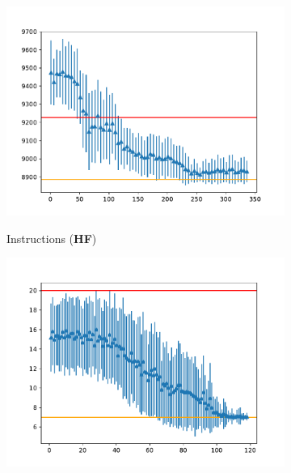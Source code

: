 \begin{figure}
     \centering
     \begin{subfigure}[b]{0.4\textwidth}
         \centering
         \includegraphics[width=\textwidth]{doccam_figures/tree_hf_lr_0001/Number_of_instructions_75_339_sparsed.pdf}
         \label{fig:inst}
         \vspace{-0.2in}
         \caption{Instructions (\textbf{HF})}
       \end{subfigure}
     \begin{subfigure}[b]{0.4\textwidth}
         \centering
         \includegraphics[width=\textwidth]{doccam_figures/tree_hf_lr_0001/COP_gadgets_75_119.pdf}
         \label{fig:cop}
         \vspace{-0.2in}

\end{subfigure}
\end{figure}
